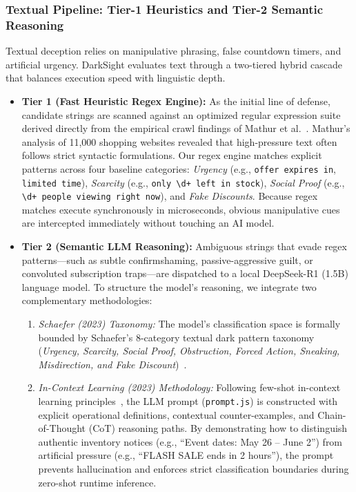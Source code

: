 \documentclass[11pt,a4paper]{article}
\begin{document}
\subsubsection{Textual Pipeline: Tier-1 Heuristics and Tier-2 Semantic Reasoning}
\label{subsubsec:textual_pipeline}

Textual deception relies on manipulative phrasing, false countdown timers, and artificial urgency. DarkSight evaluates text through a two-tiered hybrid cascade that balances execution speed with linguistic depth.

\begin{itemize}[leftmargin=*]
    \item \textbf{Tier 1 (Fast Heuristic Regex Engine):} As the initial line of defense, candidate strings are scanned against an optimized regular expression suite derived directly from the empirical crawl findings of Mathur et al.~\cite{mathur2019}. Mathur's analysis of 11,000 shopping websites revealed that high-pressure text often follows strict syntactic formulations. Our regex engine matches explicit patterns across four baseline categories: \textit{Urgency} (e.g., \texttt{offer expires in}, \texttt{limited time}), \textit{Scarcity} (e.g., \texttt{only \textbackslash d+ left in stock}), \textit{Social Proof} (e.g., \texttt{\textbackslash d+ people viewing right now}), and \textit{Fake Discounts}. Because regex matches execute synchronously in microseconds, obvious manipulative cues are intercepted immediately without touching an AI model.

    \item \textbf{Tier 2 (Semantic LLM Reasoning):} Ambiguous strings that evade regex patterns—such as subtle confirmshaming, passive-aggressive guilt, or convoluted subscription traps—are dispatched to a local DeepSeek-R1 (1.5B) language model. To structure the model's reasoning, we integrate two complementary methodologies:
    \begin{enumerate}
        \item \textit{Schaefer (2023) Taxonomy:} The model's classification space is formally bounded by Schaefer's 8-category textual dark pattern taxonomy (\textit{Urgency, Scarcity, Social Proof, Obstruction, Forced Action, Sneaking, Misdirection, and Fake Discount})~\cite{schaefer2023}.
        \item \textit{In-Context Learning (2023) Methodology:} Following few-shot in-context learning principles~\cite{incontext2023}, the LLM prompt (\texttt{prompt.js}) is constructed with explicit operational definitions, contextual counter-examples, and Chain-of-Thought (CoT) reasoning paths. By demonstrating how to distinguish authentic inventory notices (e.g., ``Event dates: May 26 -- June 2'') from artificial pressure (e.g., ``FLASH SALE ends in 2 hours''), the prompt prevents hallucination and enforces strict classification boundaries during zero-shot runtime inference.
    \end{enumerate}
\end{itemize}
\end{document}
